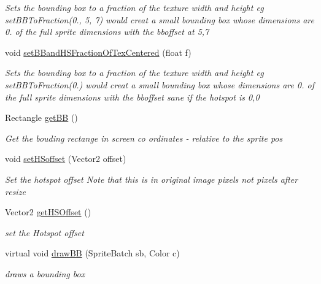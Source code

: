 \begin{DoxyCompactItemize}
\begin{DoxyCompactList}\small\item\em Sets the bounding box to a fraction of the texture width and height eg set\+B\+B\+To\+Fraction(0., 5, 7) would creat a small bounding box whose dimensions are 0. of the full sprite dimensions with the bboffset at 5,7 \end{DoxyCompactList}\item 
void \mbox{\hyperlink{class_r_c___framework_1_1_sprite3_a4c84dca0a120793e378451cefefb4183}{set\+B\+Band\+H\+S\+Fraction\+Of\+Tex\+Centered}} (float f)
\begin{DoxyCompactList}\small\item\em Sets the bounding box to a fraction of the texture width and height eg set\+B\+B\+To\+Fraction(0.) would creat a small bounding box whose dimensions are 0. of the full sprite dimensions with the bboffset sane if the hotspot is 0,0 \end{DoxyCompactList}\item 
Rectangle \mbox{\hyperlink{class_r_c___framework_1_1_sprite3_a16549a56813ed7daed2a64f6d2c3fdaf}{get\+BB}} ()
\begin{DoxyCompactList}\small\item\em Get the bouding rectange in screen co ordinates -\/ relative to the sprite pos \end{DoxyCompactList}\item 
void \mbox{\hyperlink{class_r_c___framework_1_1_sprite3_a2551e6efc55ccfb3596b0f5bff398fc1}{set\+H\+Soffset}} (Vector2 offset)
\begin{DoxyCompactList}\small\item\em Set the hotspot offset Note that this is in original image pixels not pixels after resize \end{DoxyCompactList}\item 
Vector2 \mbox{\hyperlink{class_r_c___framework_1_1_sprite3_a8f296827e1659e0b370699146d18536b}{get\+H\+S\+Offset}} ()
\begin{DoxyCompactList}\small\item\em set the Hotspot offset \end{DoxyCompactList}\item 
virtual void \mbox{\hyperlink{class_r_c___framework_1_1_sprite3_a0b6d0934cd9eea34b1d517a1d09102be}{draw\+BB}} (Sprite\+Batch sb, Color c)
\begin{DoxyCompactList}\small\item\em draws a bounding box \end{DoxyCompactList}\item 

\end{DoxyCompactItemize}
